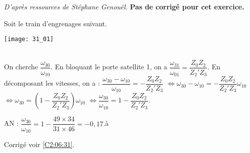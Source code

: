 \normaltrue \difficilefalse \tdifficilefalse
\correctiontrue

\renewcommand{\UPSTIidClasse}{12}

\textit{D'après ressources de Stéphane Genouël.}
\setcounter{numques}{0}
\ifcorrection
\else
\textbf{Pas de corrigé pour cet exercice.}
\fi

\ifprof
\else
Soit le train d'engrenages suivant. 
\begin{center}
\texttt{[image: 31\_01]}
\end{center}
\fi


\ifprof
\else
\fi

\ifprof ~\\
On cherche $\dfrac{\omega_{30}}{\omega_{10}}$. En bloquant le porte satellite 1, on a  
$\dfrac{\omega_{31}}{\omega_{01}}=\dfrac{Z_0 Z_2 }{Z_2' Z_3}$. En décomposant les vitesses, on a :
$\dfrac{\omega_{30}-\omega_{10}}{\omega_{10}}=-\dfrac{Z_0 Z_2 }{Z_2' Z_3}$
$\Leftrightarrow \omega_{30}-\omega_{10}=-\dfrac{Z_0 Z_2 }{Z_2' Z_3}\omega_{10}$
$\Leftrightarrow \omega_{30}=\left(1-\dfrac{Z_0 Z_2 }{Z_2' Z_3}\right)\omega_{10}$
$\Leftrightarrow \dfrac{\omega_{30}}{\omega_{10}}=1-\dfrac{Z_0 Z_2 }{Z_2' Z_3}$.

AN : $ \dfrac{\omega_{30}}{\omega_{10}}=1-\dfrac{49 \times 34}{31 \times 46}=-0,17$.à
\else
\fi


\ifprof
\else
\begin{flushright}
\footnotesize{Corrigé  voir \ref{C2:06:31}.}
\end{flushright}%
\fi